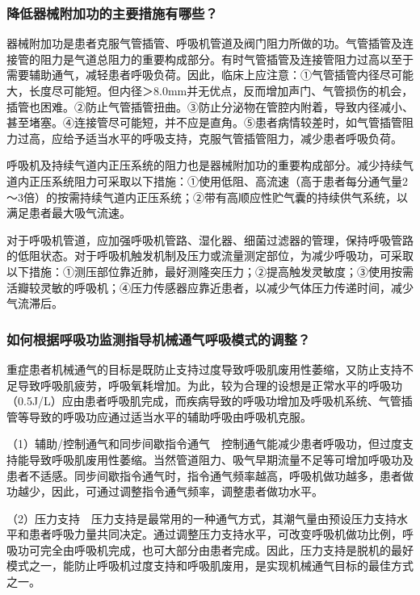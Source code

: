 \subsubsection{降低器械附加功的主要措施有哪些？}

器械附加功是患者克服气管插管、呼吸机管道及阀门阻力所做的功。气管插管及连接管的阻力是气道总阻力的重要构成部分。有时气管插管及连接管阻力过高以至于需要辅助通气，减轻患者呼吸负荷。因此，临床上应注意：①气管插管内径尽可能大，长度尽可能短。但内径＞8.0mm并无优点，反而增加声门、气管损伤的机会，插管也困难。②防止气管插管扭曲。③防止分泌物在管腔内附着，导致内径减小、甚至堵塞。④连接管尽可能短，并不应是直角。⑤患者病情较差时，如气管插管阻力过高，应给予适当水平的呼吸支持，克服气管插管阻力，减少患者呼吸负荷。

呼吸机及持续气道内正压系统的阻力也是器械附加功的重要构成部分。减少持续气道内正压系统阻力可采取以下措施：①使用低阻、高流速（高于患者每分通气量2～3倍）的按需持续气道内正压系统；②带有高顺应性贮气囊的持续供气系统，以满足患者最大吸气流速。

对于呼吸机管道，应加强呼吸机管路、湿化器、细菌过滤器的管理，保持呼吸管路的低阻状态。对于呼吸机触发机制及压力或流量测定部位，为减少呼吸功，可采取以下措施：①测压部位靠近肺，最好测隆突压力；②提高触发灵敏度；③使用按需活瓣较灵敏的呼吸机；④压力传感器应靠近患者，以减少气体压力传递时间，减少气流滞后。

\subsubsection{如何根据呼吸功监测指导机械通气呼吸模式的调整？}

重症患者机械通气的目标是既防止支持过度导致呼吸肌废用性萎缩，又防止支持不足导致呼吸肌疲劳，呼吸氧耗增加。为此，较为合理的设想是正常水平的呼吸功（0.5J/L）应由患者呼吸肌完成，而疾病导致的呼吸功增加及呼吸机系统、气管插管等导致的呼吸功应通过适当水平的辅助呼吸由呼吸机克服。

（1）辅助/控制通气和同步间歇指令通气　控制通气能减少患者呼吸功，但过度支持能导致呼吸肌废用性萎缩。当然管道阻力、吸气早期流量不足等可增加呼吸功及患者不适感。同步间歇指令通气时，指令通气频率越高，呼吸机做功越多，患者做功越少，因此，可通过调整指令通气频率，调整患者做功水平。

（2）压力支持　压力支持是最常用的一种通气方式，其潮气量由预设压力支持水平和患者呼吸力量共同决定。通过调整压力支持水平，可改变呼吸机做功比例，呼吸功可完全由呼吸机完成，也可大部分由患者完成。因此，压力支持是脱机的最好模式之一，能防止呼吸机过度支持和呼吸肌废用，是实现机械通气目标的最佳方式之一。

